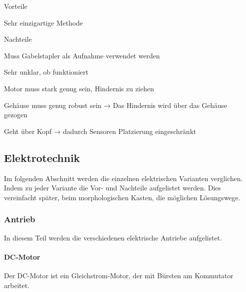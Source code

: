 \begin{minipage}[t]{0.48\textwidth}
    \begin{items}
          \item [Vorteile]
          \item Sehr einzigartige Methode
    \end{items}
\end{minipage}
\hfill
\begin{minipage}[t]{0.48\textwidth}
    \begin{items}
          \item [Nachteile]
          \item Muss Gabelstapler als Aufnahme verwendet werden
          \item Sehr unklar, ob funktioniert
          \item Motor muss stark genug sein, Hindernis zu ziehen
          \item Gehäuse muss genug robust sein → Das Hindernis wird über das Gehäuse gezogen
          \item Geht über Kopf → dadurch Sensoren Platzierung eingeschränkt
    \end{items}
\end{minipage}
\newpage
\subsection{Elektrotechnik}
Im folgenden Abschnitt werden die einzelnen elektrischen Varianten verglichen. Indem zu jeder Variante die Vor- und Nachteile aufgelistet werden. Dies vereinfacht später, beim morphologischen Kasten, die möglichen Lösungswege.

\subsubsection{Antrieb}

In diesem Teil werden die verschiedenen elektrische Antriebe aufgelistet. 

\paragraph{DC-Motor}

Der DC-Motor ist ein Gleichstrom-Motor, der mit Bürsten am Kommutator arbeitet. 

